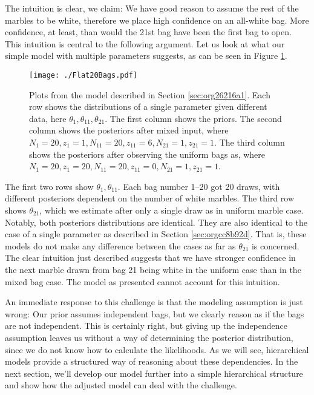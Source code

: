 \documentclass[11pt, a4paper]{article}
\begin{document}
The intuition is clear, we claim: We have good reason to assume the rest of the
marbles to be white, therefore we place high confidence on an all-white bag.
More confidence, at least, than would the 21st bag have been the first bag to
open. This intuition is central to the following argument. Let us look at what
our simple model with multiple parameters suggests, as can be seen in Figure
\ref{fig:org4e70fe9}.

\begin{figure}[htbp]
  \centering \texttt{[image: ./Flat20Bags.pdf]}
  \caption{\label{fig:org4e70fe9} Plots from the model described in Section
    \ref{sec:org26216a1}. Each row shows the distributions of a single parameter
    given different data, here \(\theta_1, \theta_{11}, \theta_{21}\). The first
    column shows the priors. The second column shows the posteriors after mixed
    input, where \(N_1 = 20, z_1 = 1, N_{11} = 20, z_{11} = 6, N_{21} = 1,
    z_{21} = 1\). The third column shows the posteriors after observing the
    uniform bags as, where \(N_1 = 20, z_1 = 20, N_{11} = 20, z_{11} = 0, N_{21}
    = 1, z_{21} = 1\).}
\end{figure}

The first two rows show \(\theta_1, \theta_{11}\). Each bag number 1--20 got 20
draws, with different posteriors dependent on the number of white marbles. The
third row shows \(\theta_{21}\), which we estimate after only a single draw as
in uniform marble case. Notably, both posteriors distributions are identical.
They are also identical to the case of a single parameter as described in
Section \ref{sec:orgcc8b92d}. That is, these models do not make any difference
between the cases as far as \(\theta_{21}\) is concerned. The clear intuition
just described suggests that we have stronger confidence in the next marble
drawn from bag 21 being white in the uniform case than in the mixed bag case.
The model as presented cannot account for this intuition.

An immediate response to this challenge is that the modeling assumption is just
wrong: Our prior assumes independent bags, but we clearly reason as if the bags
are not independent. This is certainly right, but giving up the independence
assumption leaves us without a way of determining the posterior distribution,
since we do not know how to calculate the likelihoods. As we will see,
hierarchical models provide a structured way of reasoning about these dependencies. 
In the next section, we'll develop our model further into a
simple hierarchical structure and show how the adjusted model can deal with the
challenge.
\end{document}
